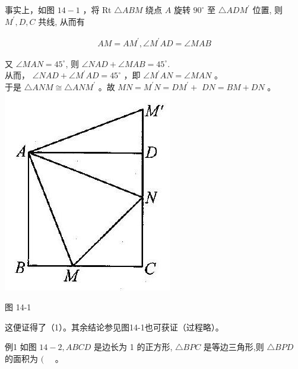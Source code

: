 \documentclass[10pt]{article}
\begin{document}
事实上，如图 $14-1$ ，将 Rt $\triangle A B M$ 绕点 $A$ 旋转 $90^{\circ}$ 至 $\triangle A D M^{\prime}$ 位置, 则 $M^{\prime}, D, C$ 共线, 从而有

\begin{align*}
A M=A M^{\prime}, \angle M^{\prime} A D=\angle M A B
\end{align*}

又 $\angle M A N=45^{\circ}$, 则 $\angle N A D+\angle M A B=45^{\circ}$.\\
从而， $\angle N A D+\angle M^{\prime} A D=45^{\circ}$ ，即 $\angle M^{\prime} A N=\angle M A N$ 。\\
于是 $\triangle A N M \cong \triangle A N M^{\prime}$ 。故 $M N=M^{\prime} N=D M^{\prime}+$ $D N=B M+D N$ 。\\
\includegraphics[max width=\textwidth, center]{2024_10_30_2c8f45efd4a519b08e1ag-127}

图 14-1

这便证得了（1）。其余结论参见图14-1也可获证（过程略）。

例1 如图 $14-2, A B C D$ 是边长为 1 的正方形, $\triangle B P C$ 是等边三角形,则 $\triangle B P D$ 的面积为 $(\quad$ 。
\end{document}
